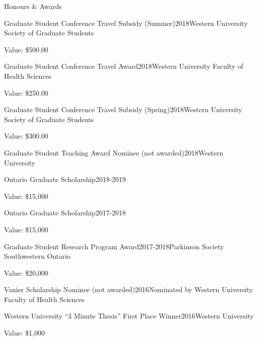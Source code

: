 \documentclass{resume} %
\begin{document}
\begin{rSection}{Honours \& Awards}

\begin{rSubsection}{Graduate Student Conference Travel Subsidy (Summer)}{2018}{Western University Society of Graduate Students}{}
\item Value: \$500.00
\end{rSubsection}

\begin{rSubsection}{Graduate Student Conference Travel Award}{2018}{Western University Faculty of Health Sciences}{}
\item Value: \$250.00
\end{rSubsection}

\begin{rSubsection}{Graduate Student Conference Travel Subsidy (Spring)}{2018}{Western University Society of Graduate Students}{}
\item Value: \$300.00
\end{rSubsection}

\begin{rSubsection}{Graduate Student Teaching Award Nominee (not awarded)}{2018}{Western University}{}
\end{rSubsection}

\begin{rSubsection}{Ontario Graduate Scholarship}{2018-2019}{}{}
\item Value: \$15,000
\end{rSubsection}

\begin{rSubsection}{Ontario Graduate Scholarship}{2017-2018}{}{}
\item Value: \$15,000
\end{rSubsection}

\begin{rSubsection}{Graduate Student Research Program Award}{2017-2018}{Parkinson Society Southwestern Ontario}{}
\item Value: \$20,000
\end{rSubsection}

\begin{rSubsection}{Vanier Scholarship Nominee (not awarded)}{2016}{Nominated by Western University Faculty of Health Sciences}{}
\end{rSubsection}

\begin{rSubsection}{Western University ``3 Minute Thesis'' First Place Winner}{2016}{Western University}{}
\item  Value: \$1,000
\end{rSubsection}


\end{rSection}
\end{document}
